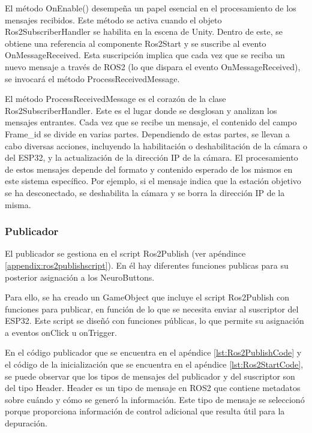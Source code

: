 El método OnEnable() desempeña un papel esencial en el procesamiento de los mensajes recibidos. Este método se activa cuando el objeto Ros2SubscriberHandler se habilita en la escena de Unity. Dentro de este, se obtiene una referencia al componente Ros2Start y se suscribe al evento OnMessageReceived. Esta suscripción implica que cada vez que se reciba un nuevo mensaje a través de ROS2 (lo que dispara el evento OnMessageReceived), se invocará el método ProcessReceivedMessage.


El método ProcessReceivedMessage es el corazón de la clase Ros2SubscriberHandler. Este es el lugar donde se desglosan y analizan los mensajes entrantes. Cada vez que se recibe un mensaje, el contenido del campo Frame\_id se divide en varias partes. Dependiendo de estas partes, se llevan a cabo diversas acciones, incluyendo la habilitación o deshabilitación de la cámara o del ESP32, y la actualización de la dirección IP de la cámara. El procesamiento de estos mensajes depende del formato y contenido esperado de los mismos en este sistema específico. Por ejemplo, si el mensaje indica que la estación objetivo se ha desconectado, se deshabilita la cámara y se borra la dirección IP de la misma.


\subsubsection{Publicador}
\label{subsubsection:publicador}
El publicador se gestiona en el script Ros2Publish (ver ap\'endince \ref{appendix:ros2publishscript}). En él hay diferentes funciones publicas para su posterior asignación a los NeuroButtons.

Para ello, se ha creado un GameObject que incluye el script Ros2Publish con funciones para publicar, en función de lo que se necesita enviar al suscriptor del ESP32. Este script se diseñó con funciones públicas, lo que permite su asignación a eventos onClick u onTrigger.



En el código publicador que se encuentra en el apéndice \ref{lst:Ros2PublishCode} y el código de la inicialización que se encuentra en el apéndice \ref{lst:Ros2StartCode}, se puede observar que los tipos de mensajes del publicador y del suscriptor son del tipo Header. Header es un tipo de mensaje en ROS2 que contiene metadatos sobre cuándo y cómo se generó la información. Este tipo de mensaje se seleccionó porque proporciona información de control adicional que resulta útil para la depuración.



